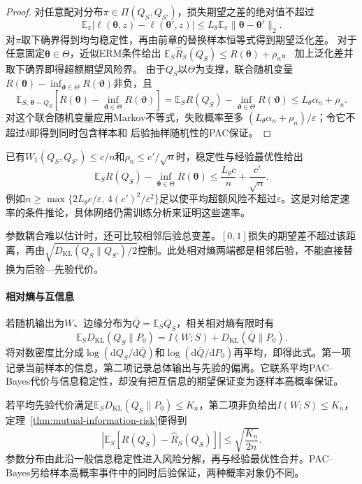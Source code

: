 \begin{proof}
对任意配对分布$\pi\in\Pi(Q_S,Q_{S'})$，损失期望之差的绝对值不超过
\[
 \mathbb E_\pi|\ell(\bm\theta,z)-\ell(\bm\theta',z)|
 \leq L_\theta\mathbb E_\pi\|\bm\theta-\bm\theta'\|_2.
\]
对$\pi$取下确界得到均匀稳定性，再由前章的替换样本恒等式得到期望泛化差。
对于任意固定$\bm\theta\in\Theta$，近似ERM条件给出
$\mathbb E_S\hat R_S(Q_S)\leq R(\bm\theta)+\rho_n$。
加上泛化差并取下确界即得超额期望风险界。
由于$Q_S$以$\Theta$为支撑，联合随机变量
$R(\bm\theta)-\inf_{\bm\vartheta\in\Theta}R(\bm\vartheta)$非负，且
\[
 \mathbb E_{S,\,\bm\theta\sim Q_S}
 \left[R(\bm\theta)-\inf_{\bm\vartheta\in\Theta}R(\bm\vartheta)\right]
 =\mathbb E_S R(Q_S)-\inf_{\bm\vartheta\in\Theta}R(\bm\vartheta)
 \leq L_\theta\alpha_n+\rho_n.
\]
对这个联合随机变量应用Markov不等式，失败概率至多
$(L_\theta\alpha_n+\rho_n)/\varepsilon$；令它不超过$\delta$即得到同时包含样本和
后验抽样随机性的PAC保证。
\end{proof}

已有$W_1(Q_S,Q_{S'})\leq c/n$和$\rho_n\leq c'/\sqrt n$时，稳定性与经验最优性给出
\[
 \mathbb E_S R(Q_S)-\inf_{\bm\theta\in\Theta}R(\bm\theta)
 \leq\frac{L_\theta c}{n}+\frac{c'}{\sqrt n}.
\]
例如$n\geq\max\{2L_\theta c/\varepsilon,\,4(c')^2/\varepsilon^2\}$足以使平均超额风险不超过$\varepsilon$。这是对给定速率的条件推论，具体网络仍需训练分析来证明这些速率。

参数耦合难以估计时，还可比较相邻后验总变差。$[0,1]$损失的期望差不超过该距离，再由$\sqrt{D_{\mathrm{KL}}(Q_S\|Q_{S'})/2}$控制。此处相对熵两端都是相邻后验，不能直接替换为后验—先验代价。

\paragraph{相对熵与互信息}

若随机输出为$W$、边缘分布为$\bar Q=\mathbb E_SQ_S$，相关相对熵有限时有
\begin{equation}
 \mathbb E_SD_{\mathrm{KL}}(Q_S\|P_0)
 =I(W;S)+D_{\mathrm{KL}}(\bar Q\|P_0).
 \label{eq:pac-bayes-information-decomposition}
\end{equation}
将对数密度比分成$\log(\mathrm dQ_S/\mathrm d\bar Q)$和$\log(\mathrm d\bar Q/\mathrm dP_0)$再平均，即得此式。第一项记录当前样本的信息，第二项记录总体输出与先验的偏离。它联系平均PAC--Bayes代价与信息稳定性，却没有把互信息的期望保证变为逐样本高概率保证。

若平均先验代价满足$\mathbb E_SD_{\mathrm{KL}}(Q_S\|P_0)\leq K_n$，第二项非负给出$I(W;S)\leq K_n$，定理~\ref{thm:mutual-information-risk}便得到
\[
 \left|\mathbb E_S[R(Q_S)-\hat R_S(Q_S)]\right|
 \leq\sqrt{\frac{K_n}{2n}}.
\]
参数分布由此沿一般信息稳定性进入风险分解，再与经验最优性合并。PAC--Bayes另给样本高概率事件中的同时后验保证，两种概率对象仍不同。

